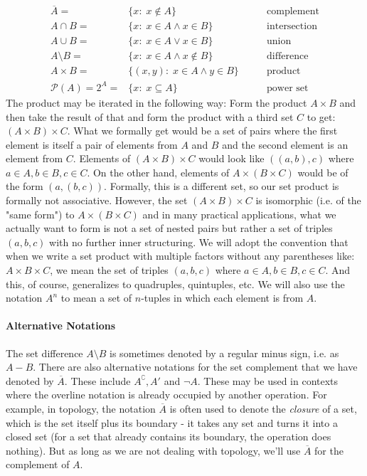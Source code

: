 \begin{eqnarray}
 \overline{A}  =& \{x: \; x \notin A \}                    \qquad &\text{complement} \\	
 A \cap B      =& \{x: \; x \in A \wedge x \in    B \}     \qquad &\text{intersection} \\
 A \cup B      =& \{x: \; x \in A \vee   x \in    B \}     \qquad &\text{union} \\
 A \setminus B =& \{x: \; x \in A \wedge x \notin B \}     \qquad &\text{difference} \\
 A \times B    =& \{(x,y): \; x \in A \wedge y \in    B \} \qquad &\text{product} \\
 \mathcal{P}(A) 
        = 2^A = &  \{x : \; x \subseteq A \}               \qquad &\text{power set}
\end{eqnarray}
The product may be iterated in the following way: Form the product $A \times B$ and then take the result of that and form the product with a third set $C$ to get: $(A \times B) \times C$. What we formally get would be a set of pairs where the first element is itself a pair of elements from $A$ and $B$ and the second element is an element from $C$. Elements of $(A \times B) \times C$ would look like $((a,b),c)$ where $a \in A, b \in B, c \in C$. On the other hand, elements of $A \times (B \times C)$ would be of the form $(a, (b,c))$. Formally, this is a different set, so our set product is formally not associative. However, the set $(A \times B) \times C$ is isomorphic (i.e. of the "same form") to $A \times (B \times C)$ and in many practical applications, what we actually want to form is not a set of nested pairs but rather a set of triples $(a,b,c)$ with no further inner structuring. We will adopt the convention that when we write a set product with multiple factors without any parentheses like: $A \times B \times C$, we mean the set of triples $(a,b,c)$ where $a \in A, b \in B, c \in C$. And this, of course, generalizes to quadruples, quintuples, etc. We will also use the notation $A^n$ to mean a set of $n$-tuples in which each element is from $A$. 


\paragraph{Alternative Notations}

The set difference $A \setminus B$ is sometimes denoted by a regular minus sign, i.e. as $A - B$. There are also alternative notations for the set complement that we have denoted by $\overline{A}$. These include $A^\complement, A'$ and $\neg A$. These may be used in contexts where the overline notation is already occupied by another operation. For example, in topology, the notation $\overline{A}$ is often used to denote the \emph{closure} of a set, which is the set itself plus its boundary - it takes any set and turns it into a closed set (for a set that already contains its boundary, the operation does nothing). But as long as we are not dealing with topology, we'll use $\overline{A}$ for the complement of $A$.

